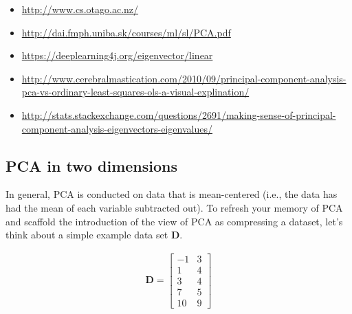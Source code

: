 \begin{itemize}
\item \href{http://www.cs.otago.ac.nz/cosc453/student_tutorials/principal_components.pdf}{http://www.cs.otago.ac.nz/}
\item \href{http://dai.fmph.uniba.sk/courses/ml/sl/PCA.pdf}{http://dai.fmph.uniba.sk/courses/ml/sl/PCA.pdf}
\item \href{https://deeplearning4j.org/eigenvector#linear}{https://deeplearning4j.org/eigenvector/linear}
\item \href{http://www.cerebralmastication.com/2010/09/principal-component-analysis-pca-vs-ordinary-least-squares-ols-a-visual-explination/}{http://www.cerebralmastication.com/2010/09/principal-component-analysis-pca-vs-ordinary-least-squares-ols-a-visual-explination/}
\item \href{http://stats.stackexchange.com/questions/2691/making-sense-of-principal-component-analysis-eigenvectors-eigenvalues/140579#140579}{http://stats.stackexchange.com/questions/2691/making-sense-of-principal-component-analysis-eigenvectors-eigenvalues/}
\end{itemize}
%
\subsection{PCA in two dimensions}
In general, PCA is conducted on data that is mean-centered (i.e., the data has had the mean of each variable subtracted out). To refresh your memory of PCA and scaffold the introduction of the view of PCA as compressing a dataset, let's think about a simple example data set $\mathbf{D}$.

\begin{align}
\mathbf{D} =
\begin{bmatrix}
-1 & 3 \\
1 & 4 \\
3 & 4 \\
7 & 5 \\
10 & 9
\end{bmatrix}
\end{align}


